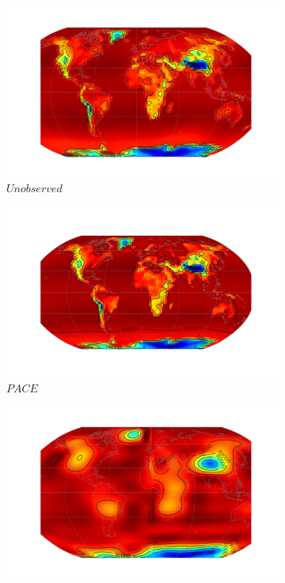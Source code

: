  \begin{figure}
 	\centering
 	\begin{subfigure}[b]{0.45\textwidth}
 		\includegraphics[width=\textwidth]{ftsm_res_ps_example_unob}
 		\caption{$Unobserved$}
 		\label{fig:ftsm_res_ps_unob}
 	\end{subfigure}             
 	\begin{subfigure}[b]{0.45\textwidth}
 		\includegraphics[width=\textwidth]{ftsm_res_ps_example_pace}
 		\caption{$PACE$}
 		\label{fig:ftsm_res_ps_pace}
 	\end{subfigure}
 	\vfill       
 	\begin{subfigure}[b]{0.45\textwidth}
 		\includegraphics[width=\textwidth]{ftsm_res_ps_example_fpca}

\end{subfigure}
\end{figure}
